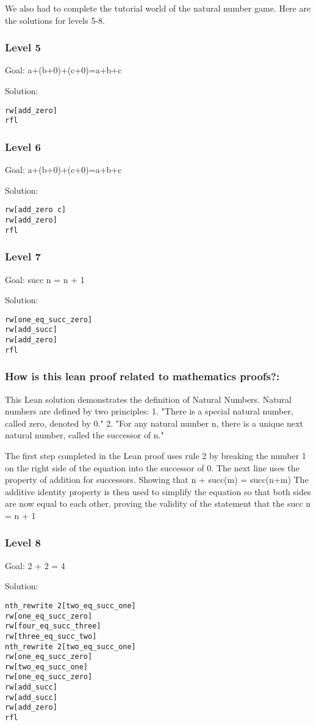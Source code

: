 \documentclass{article}
\theoremstyle{theorem}
\theoremstyle{definition}
\theoremstyle{remark}
\begin{document}
We also had to complete the tutorial world of the natural number game. 
Here are the solutions for levels 5-8.

\subsubsection*{Level 5}
Goal: a+(b+0)+(c+0)=a+b+c

Solution:
\begin{lstlisting}
rw[add_zero]
rfl
\end{lstlisting}
\subsubsection*{Level 6}
Goal: a+(b+0)+(c+0)=a+b+c

Solution:
\begin{lstlisting}
rw[add_zero c]
rw[add_zero]
rfl
\end{lstlisting}
\subsubsection*{Level 7}
Goal: succ n = n + 1

Solution:
\begin{lstlisting}
rw[one_eq_succ_zero]
rw[add_succ]
rw[add_zero]
rfl
\end{lstlisting}
\subsubsection*{How is this lean proof related to mathematics proofs?:}
This Lean solution demonstrates the definition of Natural Numbers. 
Natural numbers are defined by two principles:
1. "There is a special natural number, called zero, denoted by 0."
2. "For any natural number n, there is a unique next natural number, called
the successor of n."

The first step completed in the Lean proof uses rule 2 by breaking the number
1 on the right side of the equation into the successor of 0.
The next line uses the property of addition for successors. Showing that n + succ(m) = succ(n+m)
The additive identity property is then used to simplify the equation so that both sides are now
equal to each other, proving the validity of the statement that the succ n = n + 1
\subsubsection*{Level 8}
Goal: 2 + 2 = 4

Solution:
\begin{lstlisting}
nth_rewrite 2[two_eq_succ_one]
rw[one_eq_succ_zero]
rw[four_eq_succ_three]
rw[three_eq_succ_two]
nth_rewrite 2[two_eq_succ_one]
rw[one_eq_succ_zero]
rw[two_eq_succ_one]
rw[one_eq_succ_zero]
rw[add_succ]
rw[add_succ]
rw[add_zero]
rfl
\end{lstlisting}
\end{document}
